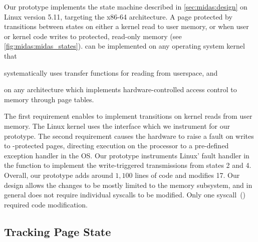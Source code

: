 Our \midas prototype implements the state machine described in
\autoref{sec:midas:design} on Linux version 5.11, targeting the x86-64
architecture.
A page protected by \midas transitions between states on
either a kernel read to user memory, or when user or kernel code
writes to protected, read-only memory (see \autoref{fig:midas:midas_states}).
\midas can be implemented on any operating system kernel that
\begin{inparaenum}
\item systematically uses transfer functions for reading from userspace, and
\item on any architecture which implements hardware-controlled access
control to memory through page tables.
\end{inparaenum}
The first requirement enables \midas to implement transitions on
kernel reads from user memory.
The Linux kernel uses the  interface which
we instrument for our prototype.
The second requirement causes the hardware to raise a fault on
writes to \midas-protected pages,
directing execution on the processor to a pre-defined exception
handler in the OS.
Our prototype instruments Linux' fault handler in the function
 to implement the write-triggered transmissions
from states 2 and 4.
Overall, our prototype adds around $1,100$ lines of code and modifies
17.
Our design allows the changes to be mostly limited to the memory
subsystem, and in general does not require individual syscalls to
be modified.
Only one syscall~() required code modification.

\subsection{Tracking Page State}

